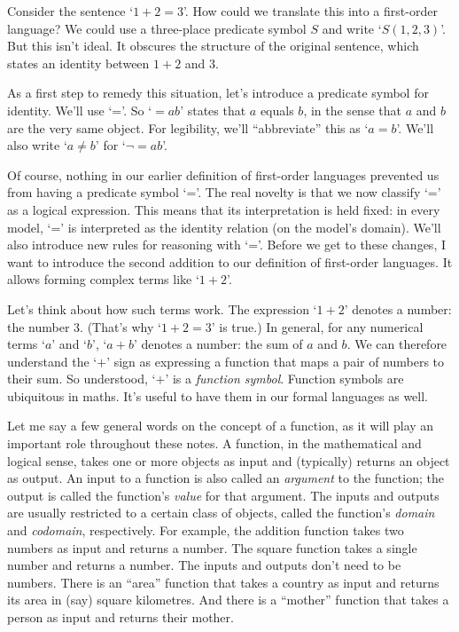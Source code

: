 Consider the sentence `$1+2=3$'.
How could we translate this into a first-order language?
We could use a three-place predicate symbol $S$ and write `$S(1,2,3)$'.
But this isn't ideal.
It obscures the structure of the original sentence,
which states an identity between $1+2$ and $3$.

As a first step to remedy this situation,
let's introduce a predicate symbol for identity.
We'll use `='.
So `$=\!ab$' states that $a$ equals $b$,
in the sense that $a$ and $b$ are the very same object.
For legibility,
we'll ``abbreviate'' this as `$a=b$'.
We'll also write `$a\not= b$' for `$\neg =\!ab$'.

Of course,
nothing in our earlier definition of first-order languages
prevented us from having a predicate symbol `='.
The real novelty is that
we now classify `=' as a logical expression.
This means that its interpretation is held fixed:
in every model,
`=' is interpreted as the identity relation (on the model's domain).
We'll also introduce new rules for reasoning with `='.
Before we get to these changes,
I want to introduce the second addition to our definition of first-order languages.
It allows forming complex terms like `$1+2$'.

Let's think about how such terms work.
The expression `$1+2$' denotes a number:
the number 3.
(That's why `$1+2 = 3$' is true.)
In general,
for any numerical terms `$a$' and `$b$',
`$a+b$' denotes a number:
the sum of $a$ and $b$.
We can therefore understand the `$+$' sign as expressing
a function that maps a pair of numbers to their sum.
So understood,
`$+$' is a \emph{function symbol}.
Function symbols are ubiquitous in maths.
It's useful to have them in our formal languages as well.

Let me say a few general words on the concept of a function,
as it will play an important role throughout these notes.
A function, in the mathematical and logical sense,
takes one or more objects as input and (typically) returns an object as output.
An input to a function is also called an \textit{argument} to the function;
the output is called the function's \textit{value} for that argument.
The inputs and outputs are usually restricted to a certain class of objects,
called the function's \emph{domain} and \emph{codomain}, respectively.
For example,
the addition function takes two numbers as input and returns a number.
The square function takes a single number and returns a number.
The inputs and outputs don't need to be numbers.
There is an ``area'' function that takes a country as input and returns its area in (say) square kilometres.
And there is a ``mother'' function that takes a person as input and returns their mother.

